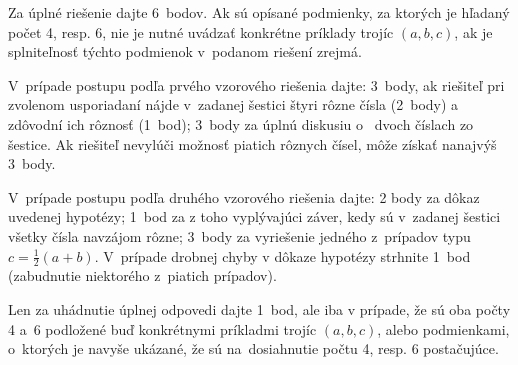{%
\schemaABC
Za úplné riešenie dajte 6~bodov. Ak sú opísané podmienky,
za ktorých je hľadaný počet 4, resp. 6,
nie je nutné uvádzať konkrétne príklady trojíc $(a,b,c)$,
ak je splniteľnosť týchto podmienok v~podanom riešení zrejmá.

V~prípade postupu podľa prvého vzorového riešenia
dajte: 3~body, ak riešiteľ pri zvolenom usporiadaní
nájde v~zadanej šestici štyri rôzne čísla (2~body) a
zdôvodní ich rôznosť (1~bod); 3~body za úplnú diskusiu
o~ dvoch číslach zo šestice.
Ak riešiteľ nevylúči možnosť piatich rôznych čísel, môže získať
nanajvýš 3~body.

V~prípade postupu podľa druhého vzorového riešenia
dajte: 2 body za dôkaz uvedenej hypotézy; 1~bod za z toho vyplývajúci
záver, kedy sú v~zadanej šestici všetky čísla navzájom rôzne;
3~body za vyriešenie jedného z~prípadov typu $c=\frac12(a+b)$.
V~prípade drobnej chyby v dôkaze hypotézy strhnite 1~bod
(zabudnutie niektorého z~piatich prípadov).

Len za uhádnutie úplnej odpovedi dajte 1~bod, ale iba v prípade, že sú
oba počty 4 a~6 podložené buď konkrétnymi príkladmi trojíc $(a,b,c)$,
alebo podmienkami, o~ktorých je navyše ukázané, že sú na~dosiahnutie
počtu 4, resp. 6 postačujúce.
\endschema
}

